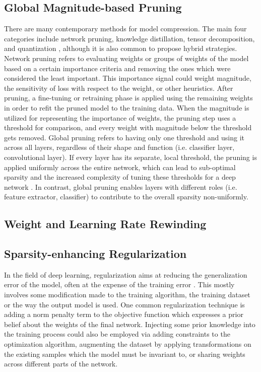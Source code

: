 \subsection{Global Magnitude-based Pruning}\label{subsec:prune}

There are many contemporary methods for model compression. The main four categories include network pruning, knowledge distillation, tensor decomposition,
and quantization \cite{survey}, although it is also common to propose hybrid strategies. Network pruning refers to evaluating weights or groups of weights
of the model based on a certain importance criteria and removing the ones which were considered the least important. This importance signal could weight
magnitude, the sensitivity of loss with respect to the weight, or other heuristics. After pruning, a fine-tuning or retraining phase is applied using the 
remaining weights in order to refit the pruned model to the training data.
When the magnitude is utilized for representing the importance of weights, the pruning step uses a threshold for comparison, and every weight with magnitude
below the threshold gets removed. Global pruning refers to having only one threshold and using it across all layers, regardless of their shape and function
(i.e. classifier layer, convolutional layer). If every layer has its separate, local threshold, the pruning is applied uniformly across the entire network,
which can lead to sub-optimal sparsity and the increased complexity of tuning these thresholds for a deep network \cite{pruning_survey24}. In contrast, 
global pruning enables layers with different roles (i.e. feature extractor, classifier) to contribute to the overall sparsity non-uniformly.

\subsection{Weight and Learning Rate Rewinding}\label{subsec:rewind}

\subsection{Sparsity-enhancing Regularization}
In the field of deep learning, regularization aims at reducing the generalization error of the model, often at the expense of the training error
\cite{Goodfellow}. This mostly involves some modification made to the training algorithm, the training dataset or the way the output model is used. 
One common regularization technique is adding a norm penalty term to the objective function which expresses a prior belief about the weights of the
final network. Injecting some prior knowledge into the training process could also be employed via adding constraints to the optimization algorithm, 
augmenting the dataset by applying transformations on the existing samples which the model must be invariant to, or sharing weights across different
parts of the network.    

